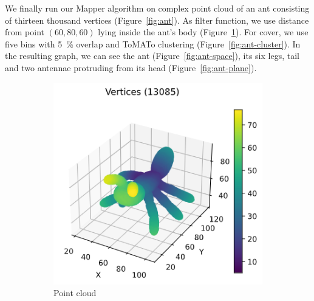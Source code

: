 \documentclass{article}
\begin{document}
We finally run our Mapper algorithm on complex point cloud of an ant consisting
of thirteen thousand vertices (Figure~\ref{fig:ant}). As filter function, we use
distance from point $(60, 80, 60)$ lying inside the ant's body
(Figure~\ref{fig:ant-points}). For cover, we use five bins with 5~\% overlap and
ToMATo clustering (Figure~\ref{fig:ant-cluster}). In the resulting graph, we can
see the ant (Figure~\ref{fig:ant-space}), its six legs, tail and two antennae protruding from its head
(Figure~\ref{fig:ant-plane}).

\begin{figure}[ht]
    \centering
    \begin{subfigure}[c]{0.3\columnwidth}
        \centering
        \includegraphics[width=\textwidth]{ant-point-cloud}
        \caption{Point cloud}
        \label{fig:ant-points}
    \end{subfigure}
    \begin{subfigure}[c]{0.3\columnwidth}
        \centering

\end{subfigure}
\end{figure}
\end{document}
